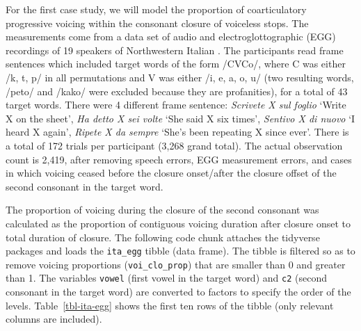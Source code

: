 \documentclass[
  authoryear,
  preprint,
  3p]{elsarticle}
\begin{document}
For the first case study, we will model the proportion of coarticulatory
progressive voicing within the consonant closure of voiceless stops. The
measurements come from a data set of audio and electroglottographic
(EGG) recordings of 19 speakers of Northwestern Italian
\citep{coretta2019k, coretta2020b}. The participants read frame
sentences which included target words of the form /CVCo/, where C was
either /k, t, p/ in all permutations and V was either /i, e, a, o, u/
(two resulting words, /peto/ and /kako/ were excluded because they are
profanities), for a total of 43 target words. There were 4 different
frame sentence: \emph{Scrivete X sul foglio} `Write X on the sheet',
\emph{Ha detto X sei volte} `She said X six times', \emph{Sentivo X di
nuovo} `I heard X again', \emph{Ripete X da sempre} `She's been
repeating X since ever'. There is a total of 172 trials per participant
(3,268 grand total). The actual observation count is 2,419, after
removing speech errors, EGG measurement errors, and cases in which
voicing ceased before the closure onset/after the closure offset of the
second consonant in the target word.

The proportion of voicing during the closure of the second consonant was
calculated as the proportion of contiguous voicing duration after
closure onset to total duration of closure. The following code chunk
attaches the tidyverse packages \citep[for reading and wrangling
data,][]{wickham2019} and loads the \texttt{ita\_egg} tibble (data
frame). The tibble is filtered so as to remove voicing proportions
(\texttt{voi\_clo\_prop}) that are smaller than 0 and greater than 1.
The variables \texttt{vowel} (first vowel in the target word) and
\texttt{c2} (second consonant in the target word) are converted to
factors to specify the order of the levels. Table~\ref{tbl-ita-egg}
shows the first ten rows of the tibble (only relevant columns are
included).
\end{document}
